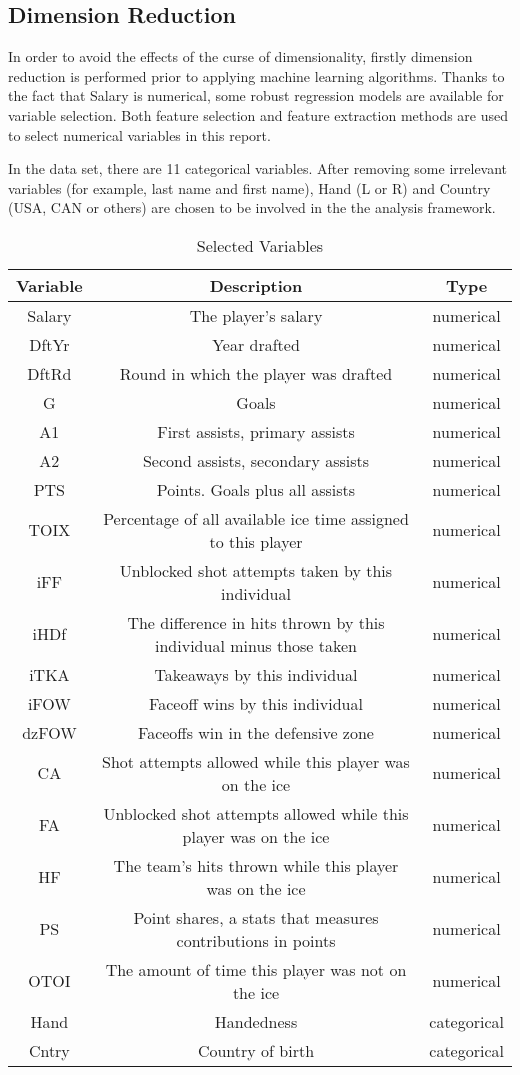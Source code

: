\subsection{Dimension Reduction}

In order to avoid the effects of the curse of dimensionality, firstly dimension reduction is performed prior to applying machine learning algorithms. Thanks to the fact that Salary is numerical, some robust regression models are available for variable selection. Both feature selection and feature extraction methods are used to select numerical variables in this report. 

In the data set, there are 11 categorical variables. After removing some irrelevant variables (for example, last name and first name), Hand (L or R) and Country (USA, CAN or others) are chosen to be involved in the the analysis framework. 

\begin{table}[h]
	\centering
	\begin{tabular}{c c c}
		Variable & Description & Type \\\hline
		Salary & The player's salary & numerical\\
		DftYr & Year drafted & numerical\\
		DftRd & Round in which the player was drafted & numerical\\
		G & Goals & numerical\\
		A1 & First assists, primary assists & numerical\\
		A2 & Second assists, secondary assists & numerical\\
		PTS & Points. Goals plus all assists & numerical\\
		TOIX & Percentage of all available ice time assigned to this player & numerical\\
		iFF & Unblocked shot attempts taken by this individual & numerical\\
		iHDf & The difference in hits thrown by this individual minus those taken & numerical\\
		iTKA  & Takeaways by this individual & numerical\\
		iFOW & Faceoff wins by this individual & numerical\\
		dzFOW & Faceoffs win in the defensive zone & numerical\\
		CA & Shot attempts allowed while this player was on the ice & numerical\\
		FA & Unblocked shot attempts allowed while this player was on the ice & numerical\\
		HF & The team's hits thrown while this player was on the ice & numerical\\
		PS & Point shares, a stats that measures contributions in points & numerical\\
		OTOI & The amount of time this player was not on the ice & numerical\\
		Hand & Handedness & categorical\\
		Cntry & Country of birth & categorical\\
	\end{tabular}
	\caption{\label{tab:widgets}Selected Variables}
\end{table}

